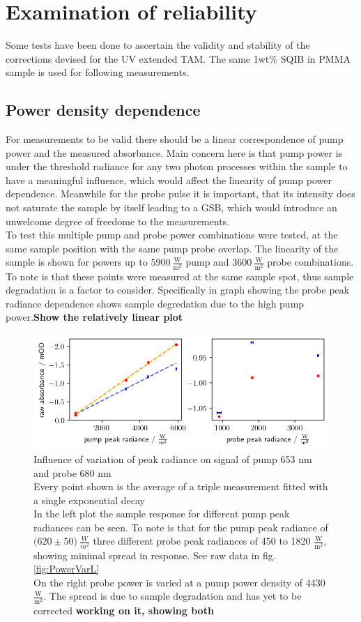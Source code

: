 \documentclass[twoside,openright]{scrreprt}
\begin{document}
\chapter{Examination of reliability}
Some tests have been done to ascertain the validity and stability of the corrections devised for the UV extended TAM. The same 1wt\% SQIB in PMMA sample is used for following measurements.
\section{Power density dependence}\label{sec:powerVar}
For measurements to be valid there should be a linear correspondence of pump power and the measured absorbance. Main concern here is that pump power is under the threshold radiance for any two photon processes within the sample to have a meaningful influence, which would affect the linearity of pump power dependence. Meanwhile for the probe pulse it is important, that its intensity does not saturate the sample by itself leading to a GSB, which would introduce an unwelcome degree of freedome to the measurements.\\
To test this multiple pump and probe power combinations were tested, at the same sample position with the same pump probe overlap. The linearity of the sample is shown for powers up to $\mathrm{5900\ \frac{W}{m^2}}$ pump and $\mathrm{3600 \ \frac{W}{m^2}}$ probe combinations. To note is that these points were measured at the same sample spot, thus sample degradation is a factor to consider. Specifically in graph showing the probe peak radiance dependence shows sample degredation due to the high pump power.\textbf{Show the relatively linear plot}

\begin{figure}[hbtp]
\centering
\includegraphics[width=\linewidth]{images/PowerVariationNotCorrected.png}
\caption{Influence of variation of peak radiance on signal of pump 653 nm and probe 680 nm\\
Every point shown is the average of a triple measurement fitted with a single exponential decay\\
In the left plot the sample response for different pump peak radiances can be seen. To note is that for the pump peak radiance of $\mathrm{(620 \pm 50})\ \frac{W}{m^2}$ three different probe peak radiances of 450 to 1820 $\mathrm{\frac{W}{m^2}}$, showing minimal spread in response. See raw data in fig. \ref{fig:PowerVarL}\\
On the right probe power is varied at a pump power density of 4430 $\mathrm{\frac{W}{m^2}}$. The spread is due to sample degradation and has yet to be corrected \textbf{working on it, showing both}\label{fig:PowerVarRaw}}
\end{figure}
\end{document}
